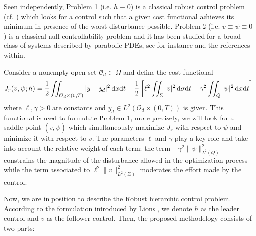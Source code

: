 \documentclass[preprint,10pt]{article}
\numberwithin{equation}{section}
\numberwithin{theorem}{section}
\def\dx{\,\textnormal{d}x}
\def\dt{\textnormal{d}t}
\def\d{\,\textnormal{d}}
\def\dx{\,\textnormal{d}x}
\def\dt{\textnormal{d}t}
\def\d{\,\textnormal{d}}
\begin{document}
{Seen independently, Problem 1 (i.e. $h\equiv 0$) is a classical robust control problem (cf. \cite{temam,temam_nonlinear,aziz}) which looks for a control such that a given cost functional achieves its minimum in presence of the worst disturbance possible. Problem 2 (i.e. $v\equiv\psi\equiv 0$) is a classical null controllability problem and it has been studied for a broad class of systems described by parabolic PDEs, see for instance \cite{cara_guerrero} and the references within.

Consider a nonempty open set $\mathcal O_d\subset \Omega$ and define the cost functional
%
\begin{equation}\label{func_rob}
J_r(v,\psi;h)=\frac{1}{2}\iint_{\mathcal O_d\times(0,T)}|y-y_d|^2\dx\dt+\frac{1}{2}\left[\ell^2\iint_{\Sigma}|v|^2\d\sigma\dt-\gamma^2\iint_Q|\psi|^2\dx\dt\right]
\end{equation}
%
%
where $\ell,\gamma>0$ are constants and $y_d\in L^2(\mathcal O_d\times(0,T))$ is given. This functional is used to formulate  Problem 1, more precisely, we will look for a saddle point $(\bar v,\bar \psi)$ which simultaneously maximize $J_r$ with respect to $\psi$ and minimize it with respect to $v$. The parameters $\ell$ and $\gamma$ play a key role and take into account the relative weight of each term: the term $-\gamma^2\|\psi\|^2_{L^2(Q)}$ constrains the magnitude of the disturbance allowed in the optimization process while the term associated to $\ell^2\|v\|^2_{L^2(\Sigma)}$ moderates the effort made by the control. 

Now, we are in position to describe the Robust hierarchic control problem. According to the formulation introduced by Lions \cite{LionsSta}, we denote $h$ as the leader control and $v$ as the follower control. Then, the proposed methodology consists of two parts:

}
\end{document}
